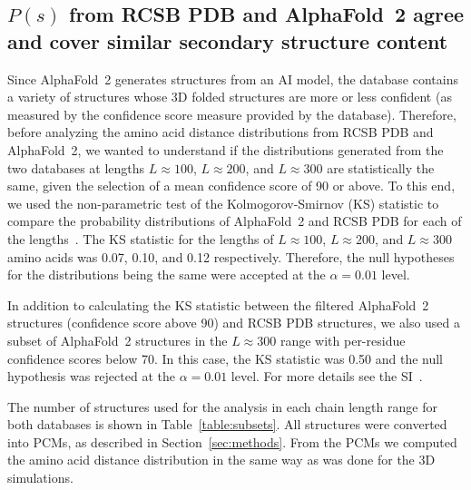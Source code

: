 \documentclass[10pt]{iopart}
\begin{document}
\subsection{$P(s)$ from RCSB PDB and AlphaFold~2 agree and cover similar secondary structure content}
Since AlphaFold~2 generates structures from an AI model, the database contains a variety of structures whose 3D folded structures are more or less confident (as measured by the confidence score measure provided by the database). Therefore, before analyzing the amino acid distance distributions from RCSB PDB and AlphaFold~2, we wanted to understand if the distributions generated from the two databases at lengths $L\approx 100$, $L \approx 200$, and $L \approx 300$ are statistically the same, given the selection of a mean confidence score of 90 or above.
To this end, we used the non-parametric test of the Kolmogorov-Smirnov (KS) statistic to compare the probability distributions of AlphaFold~2 and RCSB PDB for each of the lengths~\cite{2008kolmogorov}. The KS statistic for the lengths of $L \approx 100$, $L \approx 200$, and $L \approx 300$ amino acids was 0.07, 0.10, and 0.12 respectively. Therefore, the null hypotheses for the distributions being the same were accepted at the $\alpha=0.01$ level. 

In addition to calculating the KS statistic between the filtered AlphaFold~2 structures (confidence score above 90) and RCSB PDB structures, we also used a subset of AlphaFold~2 structures in the $L \approx 300$ range with per-residue confidence scores below 70. In this case, the KS statistic was 0.50 and the null hypothesis was rejected at the $\alpha=0.01$ level. For more details see the SI~\cite{SI}. 

The number of structures used for the analysis in each chain length range for both databases is shown in Table~\ref{table:subsets}. All structures were converted into PCMs, as described in Section~\ref{sec:methods}. From the PCMs we computed the amino acid distance distribution in the same way as was done for the 3D simulations.

\begin{table}[htb]
\centering
\setlength{\tabcolsep}{5pt}
 \caption{The number of structures used for the analysis from the RCSB PDB and AlphaFold 2 database, after filtering.}
\label{table:subsets}
\end{table}
\end{document}
